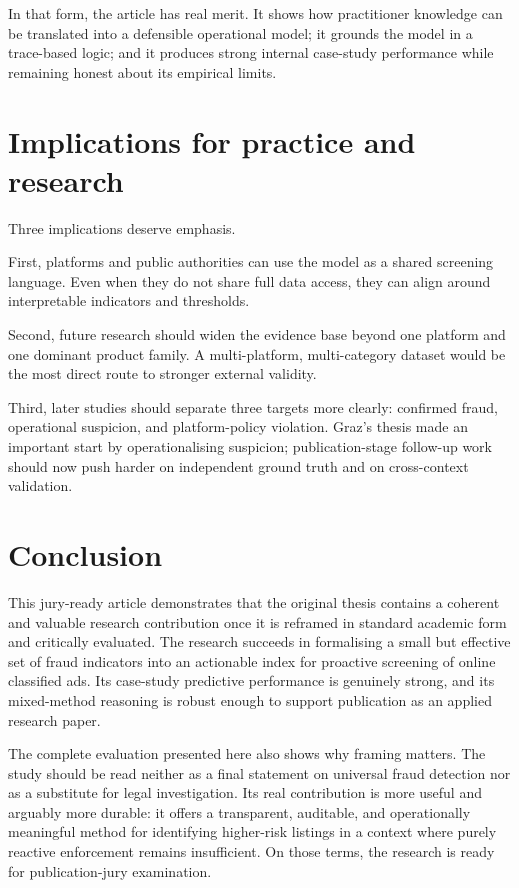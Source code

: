 \documentclass[11pt,a4paper]{article}
\begin{document}
In that form, the article has real merit. It shows how practitioner knowledge can be translated into a defensible operational model; it grounds the model in a trace-based logic; and it produces strong internal case-study performance while remaining honest about its empirical limits.

\section{Implications for practice and research}
Three implications deserve emphasis.

First, platforms and public authorities can use the model as a shared screening language. Even when they do not share full data access, they can align around interpretable indicators and thresholds.

Second, future research should widen the evidence base beyond one platform and one dominant product family. A multi-platform, multi-category dataset would be the most direct route to stronger external validity.

Third, later studies should separate three targets more clearly: confirmed fraud, operational suspicion, and platform-policy violation. Graz's thesis made an important start by operationalising suspicion; publication-stage follow-up work should now push harder on independent ground truth and on cross-context validation.

\section{Conclusion}
This jury-ready article demonstrates that the original thesis contains a coherent and valuable research contribution once it is reframed in standard academic form and critically evaluated. The research succeeds in formalising a small but effective set of fraud indicators into an actionable index for proactive screening of online classified ads. Its case-study predictive performance is genuinely strong, and its mixed-method reasoning is robust enough to support publication as an applied research paper.

The complete evaluation presented here also shows why framing matters. The study should be read neither as a final statement on universal fraud detection nor as a substitute for legal investigation. Its real contribution is more useful and arguably more durable: it offers a transparent, auditable, and operationally meaningful method for identifying higher-risk listings in a context where purely reactive enforcement remains insufficient. On those terms, the research is ready for publication-jury examination.
\end{document}
